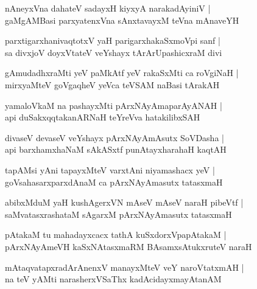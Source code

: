 \documentclass[twoside,12pt,openright]{book}
\newcounter{shloka}[chapter]
\begin{document}
\begin{shloka}
nAneyxVna dahateV sadayxH kiyxyA narakadAyiniV |\\
gaMgAMBasi parxyatenxVna sAnxtavayxM teVna mAnaveYH 
\end{shloka}

\begin{shloka}
parxtigarxhanivaqtotxV yaH parigarxhakaSxmoVpi sanf |\\
sa divxjoV doyxVtateV veYshayx tArArUpashicxraM divi
\end{shloka}

\begin{shloka}
gAmudadhxraMti yeV paMkAtf yeV rakaSxMti ca roVgiNaH |\\
mirxyaMteV  goVgaqheV yeVca teVSAM naBasi tArakAH 
\end{shloka}

\begin{shloka}
yamaloVkaM na pashayxMti pArxNAyAmaparAyANAH |\\
api duSakxqqtakanARNaH teYreVva hatakilibxSAH
\end{shloka}

\begin{shloka}
divaseV devaseV veYshayx pArxNAyAmAsutx SoVDasha |\\
api barxhamxhaNaM sAkASxtf punAtayxharahaH kaqtAH
\end{shloka}

\begin{shloka}
tapAMsi yAni tapayxMteV varxtAni niyamashacx yeV |\\
goVsahasarxparxdAnaM ca pArxNAyAmasutx tatasxmaH 
\end{shloka}

\begin{shloka}
abibxMduM yaH kushAgerxVN mAseV mAseV naraH pibeVtf |\\
saMvatasxrashataM sAgarxM pArxNAyAmasutx tatasxmaH 
\end{shloka}

\begin{shloka}
pAtakaM tu mahadayxcacx tathA kuSxdorxVpapAtakaM |\\
pArxNAyAmeVH kaSxNAtasxmaRM  BAsamxsAtukxruteV naraH 
\end{shloka}

\begin{shloka}
mAtaqvatapxradArAnenxV manayxMteV veY naroVtatxmAH |\\
na teV yAMti narasherxVSaThx kadAcidayxmayAtanAM 
\end{shloka}
\end{document}
